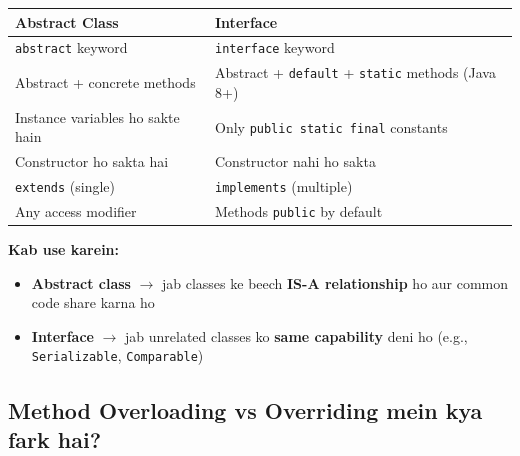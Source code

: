 \documentclass[12pt,a4paper]{article}
\begin{document}
\begin{answerbox}
\begin{center}
\begin{tabular}{p{6cm} p{6cm}}
\toprule
\textbf{Abstract Class} & \textbf{Interface} \\
\midrule
\texttt{abstract} keyword & \texttt{interface} keyword \\
Abstract + concrete methods & Abstract + \texttt{default} + \texttt{static} methods (Java 8+) \\
Instance variables ho sakte hain & Only \texttt{public static final} constants \\
Constructor ho sakta hai & Constructor nahi ho sakta \\
\texttt{extends} (single) & \texttt{implements} (multiple) \\
Any access modifier & Methods \texttt{public} by default \\
\bottomrule
\end{tabular}
\end{center}

\textbf{Kab use karein:}
\begin{itemize}
    \item \textbf{Abstract class} $\rightarrow$ jab classes ke beech \textbf{IS-A relationship} ho aur common code share karna ho
    \item \textbf{Interface} $\rightarrow$ jab unrelated classes ko \textbf{same capability} deni ho (e.g., \texttt{Serializable}, \texttt{Comparable})
\end{itemize}
\end{answerbox}

\subsection{Method Overloading vs Overriding mein kya fark hai?}
\end{document}

